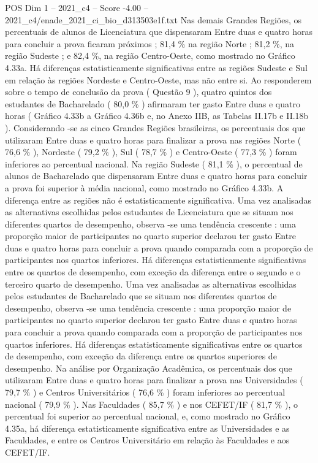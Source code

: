 \begin{textsample}{POS Dim 1 – 2021\_c4 – Score -4.00 – 2021\_c4/enade\_2021\_ci\_bio\_d313503e1f.txt}
Nas demais Grandes Regiões, os percentuais de alunos de Licenciatura que dispensaram Entre duas e quatro horas para concluir a prova ficaram próximos ; 81,4 \% na região Norte ; 81,2 \%, na região Sudeste ; e 82,4 \%, na região Centro-Oeste, como mostrado no Gráfico 4.33a.
Há diferenças estatisticamente significativas entre as regiões Sudeste e Sul em relação às regiões Nordeste e Centro-Oeste, mas não entre si.
Ao responderem sobre o tempo de conclusão da prova ( Questão 9 ), quatro quintos dos estudantes de Bacharelado ( 80,0 \% ) afirmaram ter gasto Entre duas e quatro horas ( Gráfico 4.33b a Gráfico 4.36b e, no Anexo IIB, as Tabelas II.17b e II.18b ).
Considerando -se as cinco Grandes Regiões brasileiras, os percentuais dos que utilizaram Entre duas e quatro horas para finalizar a prova nas regiões Norte ( 76,6 \% ), Nordeste ( 79,2 \% ), Sul ( 78,7 \% ) e Centro-Oeste ( 77,3 \% ) foram inferiores ao percentual nacional.
Na região Sudeste ( 81,1 \% ), o percentual de alunos de Bacharelado que dispensaram Entre duas e quatro horas para concluir a prova foi superior à média nacional, como mostrado no Gráfico 4.33b.
A diferença entre as regiões não é estatisticamente significativa.
Uma vez analisadas as alternativas escolhidas pelos estudantes de Licenciatura que se situam nos diferentes quartos de desempenho, observa -se uma tendência crescente : uma proporção maior de participantes no quarto superior declarou ter gasto Entre duas e quatro horas para concluir a prova quando comparada com a proporção de participantes nos quartos inferiores.
Há diferenças estatisticamente significativas entre os quartos de desempenho, com exceção da diferença entre o segundo e o terceiro quarto de desempenho.
Uma vez analisadas as alternativas escolhidas pelos estudantes de Bacharelado que se situam nos diferentes quartos de desempenho, observa -se uma tendência crescente : uma proporção maior de participantes no quarto superior declarou ter gasto Entre duas e quatro horas para concluir a prova quando comparada com a proporção de participantes nos quartos inferiores.
Há diferenças estatisticamente significativas entre os quartos de desempenho, com exceção da diferença entre os quartos superiores de desempenho.
Na análise por Organização Acadêmica, os percentuais dos que utilizaram Entre duas e quatro horas para finalizar a prova nas Universidades ( 79,7 \% ) e Centros Universitários ( 76,6 \% ) foram inferiores ao percentual nacional ( 79,9 \% ).
Nas Faculdades ( 85,7 \% ) e nos CEFET/IF ( 81,7 \% ), o percentual foi superior ao percentual nacional, e, como mostrado no Gráfico 4.35a, há diferença estatisticamente significativa entre as Universidades e as Faculdades, e entre os Centros Universitário em relação às Faculdades e aos CEFET/IF.

\end{textsample}
